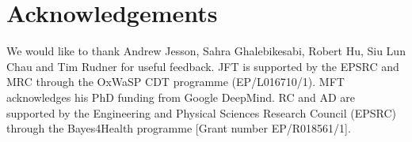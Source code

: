 

\section*{Acknowledgements}
We would like to thank Andrew Jesson, Sahra Ghalebikesabi, Robert Hu, Siu Lun Chau and Tim Rudner for useful feedback.
JFT is supported by the EPSRC and MRC through the OxWaSP CDT programme (EP/L016710/1).
MFT acknowledges his PhD funding from Google DeepMind.
RC and AD are supported by the Engineering and Physical Sciences Research Council (EPSRC) through the Bayes4Health programme [Grant number EP/R018561/1].  

% 


